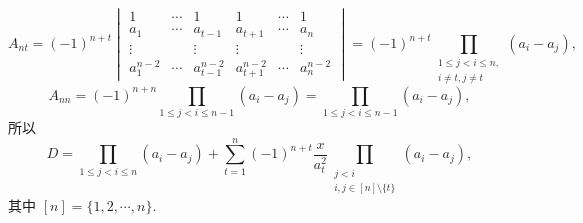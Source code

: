 \documentclass[../../main.tex]{subfiles}
\begin{document}
\begin{solution}
\[\]
\[
A_{nt} = (-1)^{n + t} \begin{vmatrix} 1 & \cdots & 1 & 1 & \cdots & 1 \\ a_1 & \cdots & a_{t - 1} & a_{t + 1} & \cdots & a_n \\ \vdots & & \vdots & \vdots & & \vdots \\ a_1^{n - 2} & \cdots & a_{t - 1}^{n - 2} & a_{t + 1}^{n - 2} & \cdots & a_n^{n - 2} \end{vmatrix} = (-1)^{n + t} \prod_{\substack{1 \leqslant j < i \leqslant n, \\ i \neq t, j \neq t}} (a_i - a_j),
\]
\[
A_{nn}=(-1)^{n+n}\prod_{1\leqslant j<i\leqslant n-1}{\left( a_i-a_j \right)}=\prod_{1\leqslant j<i\leqslant n-1}{\left( a_i-a_j \right)},
\]
所以
\[
D = \prod_{1 \leqslant j < i \leqslant n} (a_i - a_j) + \sum_{t = 1}^n (-1)^{n + t} \dfrac{x}{a_t^2} \prod_{\substack{j < i \\ i, j \in [n] \setminus \{t\}}} (a_i - a_j),
\]
其中 \([n] = \{1, 2, \cdots, n\}\).

\end{solution}
\end{document}
